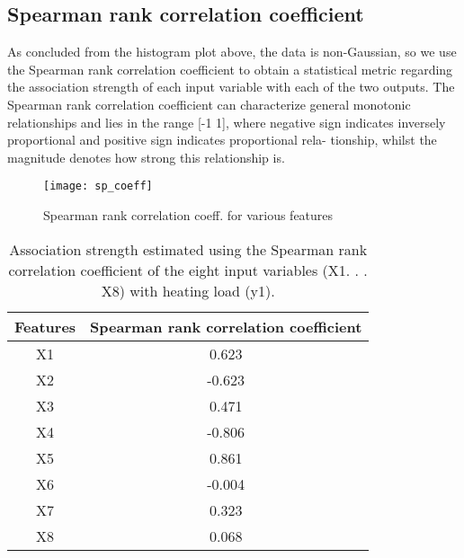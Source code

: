   \subsection{Spearman rank correlation coefficient}
    As concluded from the histogram plot above, the data is non-Gaussian, so we use the Spearman rank correlation coefficient to obtain a statistical metric regarding the association strength of each input variable with each of the two outputs. The Spearman rank correlation coefficient can characterize general monotonic relationships and lies in the range [-1 1], where negative sign indicates inversely proportional and positive sign indicates proportional rela- tionship, whilst the magnitude denotes how strong this relationship is.
    \begin{figure}[htbp]
      \hspace*{-2.1cm}
      \texttt{[image: sp\_coeff]}
      \caption{Spearman rank correlation coeff. for various features}
      \label{fig:sp_coeff}
    \end{figure}
    \newpage
    \begin{table}[h!]
          \centering
          \caption{Association strength estimated using the Spearman rank correlation coefficient of the eight input variables (X1. . . X8) with heating load (y1).}
          \label{tab:sprcoeffhl}
          \begin{tabular}{c|c}
            Features & Spearman rank correlation coefficient\\
            \hline
            X1 & 0.623 \\
            \hline
            X2 & -0.623 \\
            \hline
            X3 & 0.471 \\
            \hline
            X4 & -0.806 \\
            \hline
            X5 & 0.861 \\
            \hline
            X6 & -0.004 \\
            \hline
            X7 & 0.323 \\
            \hline
            X8 & 0.068 \\
            \hline
          \end{tabular}
    \end{table}
    
